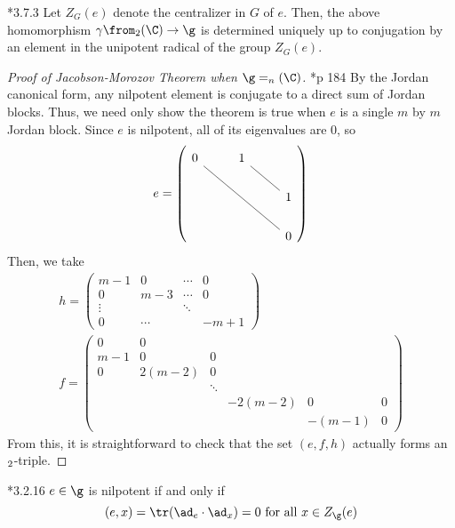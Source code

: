 \begin{prop}
  \cite{cg}*{3.7.3} Let \(Z_G(e)\) denote the centralizer in \(G\) of
  \(e\). Then, the 
  above homomorphism \(\gamma \from \sl_2(\C) \to \g\) is determined
  uniquely up to conjugation by an element in the unipotent radical of
  the group \(Z_G(e)\).
\end{prop}
\begin{proof}[Proof of Jacobson-Morozov Theorem when \(\g = \sl_n(\C)\)]
  \cite{cg}*{p 184} By the Jordan canonical form, any nilpotent
  element is conjugate to 
  a direct sum of Jordan blocks. Thus, we need only show the theorem
  is true when \(e\) is a single \(m\) by \(m\) Jordan block. Since
  \(e\) is nilpotent, all of its eigenvalues are \(0\), so \[
    e = \left(
      \begin{tikzcd}
        0 \ar[rrdd, dash]&1 \ar[rd, dash]& \\
        & & 1 \\
        & & 0
      \end{tikzcd}
\right)
\]
Then, we take
\begin{align*}
  h = \left(
    \begin{array}{cccc}
      m-1&0&\cdots&0 \\
      0&m-3&\cdots&0 \\
      \vdots &&\ddots& \\
      0&\cdots& &-m+1
    \end{array}
\right) \\  f = \left(
  \begin{array}{cccccc}
    0&0&&&& \\
    m-1&0&0&&&\\
    0&2(m-2)&0&&&\\
     &&\ddots&&&\\
     &&&-2(m-2)&0&0 \\
    &&&&-(m-1)&0
  \end{array}
\right)
\end{align*}
From this, it is straightforward to check that the set \((e,f,h)\)
actually forms an \(\sl_2\)-triple.
\end{proof}
\begin{lem}
 \cite{cg}*{3.2.16} \(e \in \g\) is nilpotent if and only if \[
    (e,x) = \tr(\ad_e \cdot \ad_x) = 0 \text{ for all } x \in Z_\g(e)
  \]
\end{lem}
